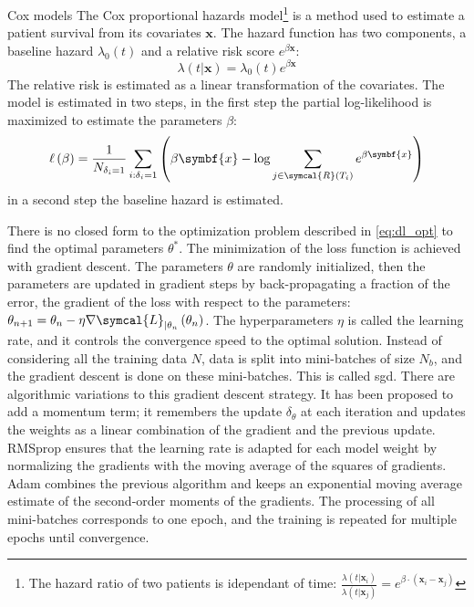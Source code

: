 \documentclass[../main.tex]{subfiles}
\begin{document}
		\begin{mybox}[label={box:cox}]{Cox models}
			The Cox proportional hazards model\footnote{The hazard ratio of two patients is idependant of time: \(\frac{\lambda(t | \symbf{x}_{i})}{\lambda(t | \symbf{x}_{j})} = e^{\beta\cdot \left(\symbf{x}_{i} - \symbf{x}_{j}\right)}\)} is a method used to estimate a patient survival from its covariates \(\symbf{x}\). 
			The hazard function has two components, a baseline hazard \(\lambda_0(t)\) and a relative risk score \(e^{\beta \symbf{x}}\): 
			\[\lambda(t | \symbf{x}) = \lambda_0(t) e^{\beta \symbf{x}}\]
			The relative risk is estimated as a linear transformation of the covariates. 
			The model is estimated in two steps, in the first step the partial log-likelihood is maximized to estimate the parameters \(\beta\):
			\[\ell\left(\beta\right) = \frac{1}{N_{\delta_i = 1}} \sum_{i:\delta_i=1} \left(\beta \symbf{x} - \log \sum_{j \in \symcal{R}(T_i)}e^{\beta \symbf{x}} \right)\]
			in a second step the baseline hazard is estimated. 
		\end{mybox}

		There is no closed form to the optimization problem described in \cref{eq:dl_opt} to find the optimal parameters \(\theta^{*}\).
		The minimization of the loss function is achieved with gradient descent.
		The parameters \(\theta\) are randomly initialized, then the parameters are updated in gradient steps by back-propagating a fraction of the error, \ie{}the gradient of the loss with respect to the parameters: \(\theta_{n+1} = \theta_{n} - \eta \nabla \symcal{L}_{|\theta_n}\left(\theta_{n}\right)\).
		The hyperparameters \(\eta\) is called the learning rate, and it controls the convergence speed to the optimal solution.
		Instead of considering all the training data \(N\), data is split into mini-batches of size \(N_b\), and the gradient descent is done on these mini-batches.
		This is called \gls{sgd}.
		There are algorithmic variations to this gradient descent strategy.
		It has been proposed to add a momentum term; it remembers the update \(\delta_{\theta}\) at each iteration and updates the weights as a linear combination of the gradient and the previous update.
		RMSprop ensures that the learning rate is adapted for each model weight by normalizing the gradients with the moving average of the squares of gradients.
		Adam combines the previous algorithm and keeps an exponential moving average estimate of the second-order moments of the gradients.
		The processing of all mini-batches corresponds to one epoch, and the training is repeated for multiple epochs until convergence.
\end{document}
